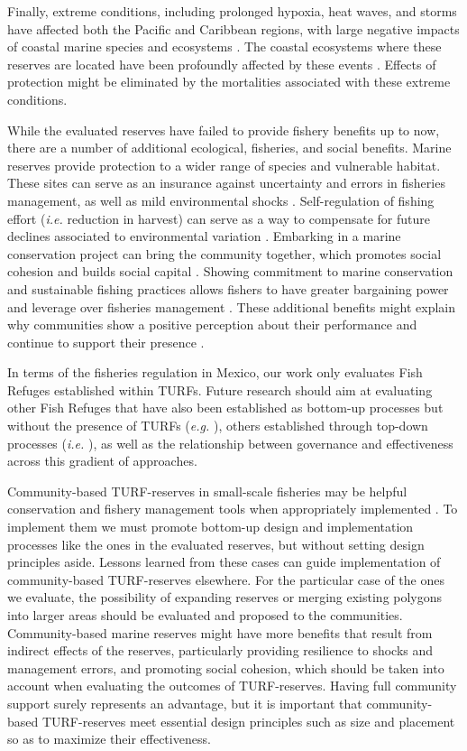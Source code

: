\documentclass{frontiersSCNS}
\begin{document}
Finally, extreme conditions, including prolonged hypoxia, heat waves,
and storms have affected both the Pacific and Caribbean regions, with
large negative impacts of coastal marine species and ecosystems
\citep{cavole_2016,hughes_2018,breitburg_2018}. The coastal ecosystems
where these reserves are located have been profoundly affected by these
events \citep{micheli_2012-EU,woodson}. Effects of protection might be
eliminated by the mortalities associated with these extreme conditions.

While the evaluated reserves have failed to provide fishery benefits up
to now, there are a number of additional ecological, fisheries, and
social benefits. Marine reserves provide protection to a wider range of
species and vulnerable habitat. These sites can serve as an insurance
against uncertainty and errors in fisheries management, as well as mild
environmental shocks
\citep{micheli_2012-EU,deleo_2015,roberts_2017-J9,aalto}.
Self-regulation of fishing effort (\emph{i.e.} reduction in harvest) can
serve as a way to compensate for future declines associated to
environmental variation \citep{finkbeiner_2018}. Embarking in a marine
conservation project can bring the community together, which promotes
social cohesion and builds social capital \citep{fulton_2019}. Showing
commitment to marine conservation and sustainable fishing practices
allows fishers to have greater bargaining power and leverage over
fisheries management \citep{prezramrez_2012}. These additional benefits
might explain why communities show a positive perception about their
performance and continue to support their presence \citep{ayer_2018}.

In terms of the fisheries regulation in Mexico, our work only evaluates
Fish Refuges established within TURFs. Future research should aim at
evaluating other Fish Refuges that have also been established as
bottom-up processes but without the presence of TURFs (\emph{e.g.}
\citet{dof_websiteC_2012}), others established through top-down
processes (\emph{i.e.} \citet{dof_websiteU_2018}), as well as the
relationship between governance and effectiveness across this gradient
of approaches.

Community-based TURF-reserves in small-scale fisheries may be helpful
conservation and fishery management tools when appropriately implemented
\citep{gelcich_2015}. To implement them we must promote bottom-up design
and implementation processes like the ones in the evaluated reserves,
but without setting design principles aside. Lessons learned from these
cases can guide implementation of community-based TURF-reserves
elsewhere. For the particular case of the ones we evaluate, the
possibility of expanding reserves or merging existing polygons into
larger areas should be evaluated and proposed to the communities.
Community-based marine reserves might have more benefits that result
from indirect effects of the reserves, particularly providing resilience
to shocks and management errors, and promoting social cohesion, which
should be taken into account when evaluating the outcomes of
TURF-reserves. Having full community support surely represents an
advantage, but it is important that community-based TURF-reserves meet
essential design principles such as size and placement so as to maximize
their effectiveness.
\end{document}
